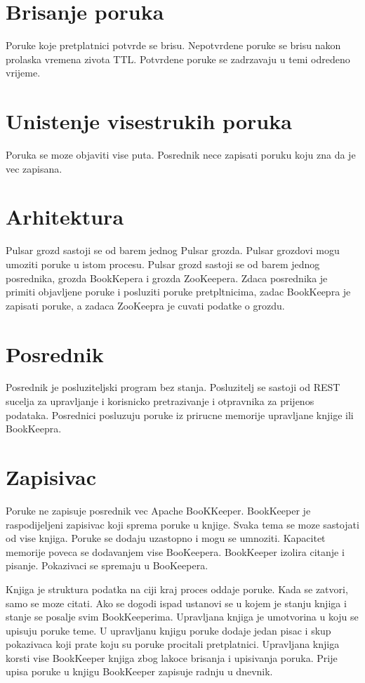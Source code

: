 \documentclass[times, utf8, diplomski, numeric]{fer}
\begin{document}
\chapter{Brisanje poruka}
Poruke koje pretplatnici potvrde se brisu. Nepotvrdene poruke se brisu nakon prolaska vremena zivota TTL. Potvrdene poruke se zadrzavaju u temi odredeno vrijeme.

\chapter{Unistenje visestrukih poruka}
Poruka se moze objaviti vise puta. Posrednik nece zapisati poruku koju zna da je vec zapisana.

\chapter{Arhitektura}
Pulsar grozd sastoji se od barem jednog Pulsar grozda. Pulsar grozdovi mogu umoziti poruke u istom procesu. Pulsar grozd sastoji se od barem jednog posrednika, grozda BookKepera i grozda ZooKeepera. Zdaca posrednika je primiti objavljene poruke i posluziti poruke pretpltnicima, zadac BookKeepra je zapisati poruke, a zadaca ZooKeepra je cuvati podatke o grozdu.

\chapter{Posrednik}
Posrednik je posluziteljski program bez stanja. Posluzitelj se sastoji od REST sucelja za upravljanje i korisnicko pretrazivanje i otpravnika za prijenos podataka. Posrednici posluzuju poruke iz prirucne memorije upravljane knjige ili BookKeepra.

\chapter{Zapisivac}
Poruke ne zapisuje posrednik vec Apache BooKKeeper. BookKeeper je raspodijeljeni zapisivac koji sprema poruke u knjige. Svaka tema se moze sastojati od vise knjiga. Poruke se dodaju uzastopno i mogu se umnoziti. Kapacitet memorije poveca se dodavanjem vise BooKeepera. BookKeeper izolira citanje i pisanje. Pokazivaci se spremaju u BooKeepera. 

Knjiga je struktura podatka na ciji kraj proces oddaje poruke. Kada se zatvori, samo se moze citati. Ako se dogodi ispad ustanovi se u kojem je stanju knjiga i stanje se posalje svim BookKeeperima. Upravljana knjiga je umotvorina u koju se upisuju poruke teme. U upravljanu knjigu poruke dodaje jedan pisac i skup pokazivaca koji prate koju su poruke procitali pretplatnici. Upravljana knjiga korsti vise BookKeeper knjiga zbog lakoce brisanja i upisivanja poruka. Prije upisa poruke u knjigu BookKeeper zapisuje radnju u dnevnik. 
\end{document}
